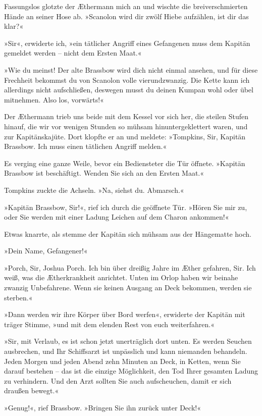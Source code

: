 Fassungslos glotzte der Æthermann mich an und wischte die
breiverschmierten Hände an seiner Hose ab. »Scanolon wird dir zwölf
Hiebe aufzählen, ist dir das klar?«

»Sir«, erwiderte ich, »ein tätlicher Angriff eines Gefangenen muss
dem Kapitän gemeldet werden – nicht dem Ersten Maat.«

»Wie du meinst! Der alte Brassbow wird dich nicht einmal ansehen,
und für diese Frechheit bekommst du von Scanolon volle
vierundzwanzig. Die Kette kann ich allerdings nicht aufschließen,
deswegen musst du deinen Kumpan wohl oder übel mitnehmen. Also los,
vorwärts!«

\bigpar

Der Æthermann trieb uns beide mit dem Kessel vor sich her, die
steilen Stufen hinauf, die wir vor wenigen Stunden so mühsam
hinuntergeklettert waren, und zur Kapitänskajüte. Dort klopfte er
an und meldete: »Tompkins, Sir, Kapitän Brassbow. Ich muss einen
tätlichen Angriff melden.«

Es verging eine ganze Weile, bevor ein Bediensteter die Tür
öffnete. »Kapitän Brassbow ist beschäftigt. Wenden Sie sich an den
Ersten Maat.«

Tompkins zuckte die Achseln. »Na, siehst du. Abmarsch.«

»Kapitän Brassbow, Sir!«, rief ich durch die geöffnete Tür. »Hören
Sie mir zu, oder Sie werden mit einer Ladung Leichen auf dem Charon
ankommen!«

Etwas knarrte, als stemme der Kapitän sich mühsam aus der
Hängematte hoch.

»Dein Name, Gefangener!«

»Porch, Sir, Joshua Porch. Ich bin über dreißig Jahre im Æther
gefahren, Sir. Ich weiß, was die Ætherkrankheit anrichtet. Unten im
Orlop haben wir beinahe zwanzig Unbefahrene. Wenn sie keinen
Ausgang an Deck bekommen, werden sie sterben.«

»Dann werden wir ihre Körper über Bord werfen«, erwiderte der
Kapitän mit träger Stimme, »und mit dem elenden Rest von euch
weiterfahren.«

»Sir, mit Verlaub, es ist schon jetzt unerträglich dort unten. Es
werden Seuchen ausbrechen, und Ihr Schiffsarzt ist unpässlich und
kann niemanden behandeln. Jeden Morgen und jeden Abend zehn Minuten
an Deck, in Ketten, wenn Sie darauf bestehen – das ist die einzige
Möglichkeit, den Tod Ihrer gesamten Ladung zu verhindern. Und den
Arzt sollten Sie auch aufscheuchen, damit er sich draußen bewegt.«

»Genug!«, rief Brassbow. »Bringen Sie ihn zurück unter Deck!«

